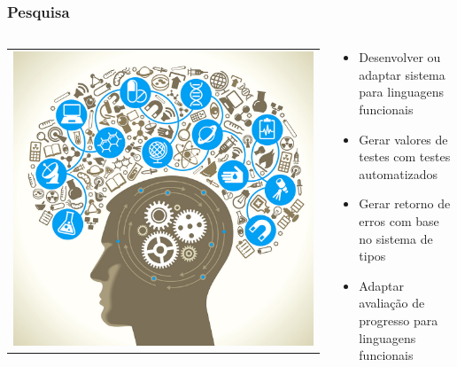 \documentclass{beamer}
\begin{document}
\begin{frame}[fragile]
  \frametitle{Pesquisa}

  \begin{columns}[T]
    \begin{column}{.35\textwidth}
      \begin{tabular}{c}
        \includegraphics[scale=0.1]{img/pesquisa.jpg}
      \end{tabular}
    \end{column}
    
    \begin{column}{.65\textwidth}

      \begin{itemize}
        \item Desenvolver ou adaptar sistema para linguagens funcionais
        \item Gerar valores de testes com testes automatizados
        \item Gerar retorno de erros com base no sistema de tipos
        \item Adaptar avaliação de progresso para linguagens funcionais
      \end{itemize}

    \end{column}
  \end{columns}
\end{frame}
\end{document}
